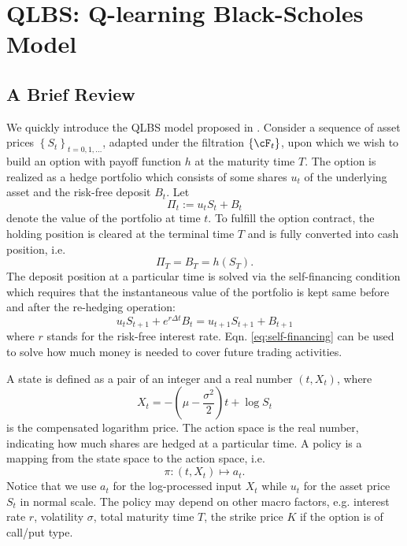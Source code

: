 \section{QLBS: Q-learning Black-Scholes Model}

\subsection{A Brief Review}

We quickly introduce the QLBS model proposed in \cite{halperin2020qlbs}.
Consider a sequence of asset prices $\left\{ S_{t}\right\} _{t=0,1,\dots}$,
adapted under the filtration $\left\{ \cF_{t}\right\} $, upon which
we wish to build an option with payoff function $h$ at the maturity
time $T$. The option is realized as a hedge portfolio which consists
of some shares $u_{t}$ of the underlying asset and the risk-free
deposit $B_{t}$. Let 
\[
\Pi_{t}:=u_{t}S_{t}+B_{t}
\]
denote the value of the portfolio at time $t$. To fulfill the option
contract, the holding position is cleared at the terminal time $T$
and is fully converted into cash position, i.e.
\[
\Pi_{T}=B_{T}=h\left(S_{T}\right).
\]
The deposit position at a particular time is solved via the self-financing
condition which requires that the instantaneous value of the portfolio
is kept same before and after the re-hedging operation:
\begin{equation}
u_{t}S_{t+1}+e^{r\Delta t}B_{t}=u_{t+1}S_{t+1}+B_{t+1}\label{eq:self-financing}
\end{equation}
where $r$ stands for the risk-free interest rate. Eqn. \ref{eq:self-financing}
can be used to solve how much money is needed to cover future trading
activities.

A state is defined as a pair of an integer and a real number $\left(t,X_{t}\right)$,
where 
\[
X_{t}=-\left(\mu-\frac{\sigma^{2}}{2}\right)t+\log S_{t}
\]
is the compensated logarithm price. The action space is the real number,
indicating how much shares are hedged at a particular time. A policy
is a mapping from the state space to the action space, i.e.
\[
\pi:\left(t,X_{t}\right)\mapsto a_{t}.
\]
Notice that we use $a_{t}$ for the log-processed input $X_{t}$ while
$u_{t}$ for the asset price $S_{t}$ in normal scale. The policy
may depend on other macro factors, e.g. interest rate $r$, volatility
$\sigma$, total maturity time $T$, the strike price $K$ if the
option is of call/put type.

